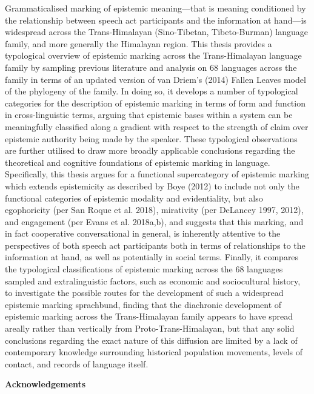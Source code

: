 Grammaticalised marking of epistemic meaning---that is meaning conditioned by the relationship between speech act participants and the information at hand---is widespread across the Trans-Himalayan (Sino-Tibetan, Tibeto-Burman) language family, and more generally the Himalayan region. This thesis provides a typological overview of epistemic marking across the Trans-Himalayan language family by sampling previous literature and analysis on 68 languages across the family in terms of an updated version of van Driem's (2014) Fallen Leaves model of the phylogeny of the family. In doing so, it develops a number of typological categories for the description of epistemic marking in terms of form and function in cross-linguistic terms, arguing that epistemic bases within a system can be meaningfully classified along a gradient with respect to the strength of claim over epistemic authority being made by the speaker. These typological observations are further utilised to draw more broadly applicable conclusions regarding the theoretical and cognitive foundations of epistemic marking in language. Specifically, this thesis argues for a functional supercategory of epistemic marking which extends epistemicity as described by Boye (2012) to include not only the functional categories of epistemic modality and evidentiality, but also egophoricity (per San Roque et al. 2018), mirativity (per DeLancey 1997, 2012), and engagement (per Evans et al. 2018a,b), and suggests that this marking, and in fact cooperative conversational in general, is inherently attentive to the perspectives of both speech act participants both in terms of relationships to the information at hand, as well as potentially in social terms. Finally, it compares the typological classifications of epistemic marking across the 68 languages sampled and extralinguistic factors, such as economic and sociocultural history, to investigate the possible routes for the development of such a widespread epistemic marking sprachbund, finding that the diachronic development of epistemic marking across the Trans-Himalayan family appears to have spread areally rather than vertically from Proto-Trans-Himalayan, but that any solid conclusions regarding the exact nature of this diffusion are limited by a lack of contemporary knowledge surrounding historical population movements, levels of contact, and records of language itself.
\newpage
\begin{center}
    \large
    \textbf{Acknowledgements}

\end{center}
\normalsize

